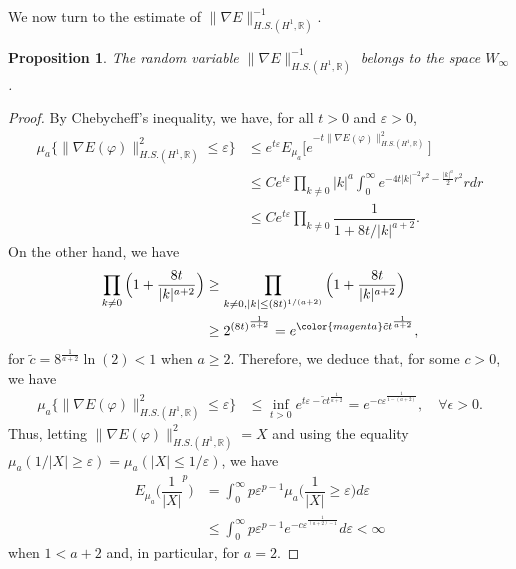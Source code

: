 \documentclass[11pt,leqno]{amsart}
\newtheorem{prop}{Proposition}[section]
\newcommand{\R}{\mathbb{R}}
\begin{document}
We now turn to the estimate of $\|\nabla E\|^{-1}_{H.S. ( H^1 , \mathbb R) }$.



\begin{prop} \label{Prop_E^-1W}
The random variable $\|\nabla E\|^{-1}_{H.S. ( H^1 ,  \mathbb R) }$ belongs to the space $W_\infty$.
\end{prop}
\begin{proof}
By Chebycheff's  inequality, we have, for all $t>0$ and $\varepsilon >0$,
\begin{align*}
\mu_a \{\|\nabla E (\varphi)\|_{H.S. ( H^1 ,  \mathbb R ) }^2 \leq \varepsilon\}& \leq e^{t\varepsilon} E_{\mu_a} \big[ e^{-t \|\nabla E(\varphi) \|_{H.S. ( H^1 , \R) }^2 }\big]\\
&\leq C e^{t\varepsilon}\prod_{k\neq 0} |k|^a \int_0^\infty e^{- 4 t |k|^{-2} r^2 - \frac{|k|^{a}}{2} r^2} rdr\\
&\leq C e^{t\varepsilon} \prod_{k\neq 0}  \dfrac{1}{1+ 8t/|k|^{a+2}}.
\end{align*}
On the other hand, we have %
\begin{align*}
\prod_{k\neq 0}   \Big(1+ \dfrac{8t}{|k|^{a+2}}\Big)& \geq \prod_{k\neq 0, |k|\leq (8t)^{1/(a+2)}}   \Big(1+ \dfrac{8t}{|k|^{a+2}}\Big) \\
&\geq 2^{(8t)^{\frac{1}{a+2}}} = e^{{\color{magenta} \tilde{c} }  t^{\frac{1}{a+2}}},
\end{align*}
 for $\tilde{c} =8^{\frac{1}{a+2}} \ln(2) <1$ when $a\geq 2$. Therefore, we deduce that, for some $c>0$, we have  %
\begin{align*}
\mu_a \{\|\nabla E (\varphi)\|_{H.S. ( H^1 , \R) }^2   \leq  \varepsilon\}& \leq  \inf_{t>0}  e^{t\varepsilon - { \tilde{c} }  t^{\frac{1}{a+2}} }
=e^{-c \varepsilon^{\frac{1}{1-(a+2)}}}, { \quad \forall \epsilon >0.}
\end{align*} 
Thus, letting $\|\nabla E (\varphi)\|_{H.S. ( H^1 ,  \mathbb R )}^2=X$ and using the equality $\mu_a (1/|X| \geq \varepsilon) = \mu_a(|X|\leq 1/\varepsilon)$, we have
 \begin{align*}
E_{\mu_a}\Big(\dfrac{1}{|X|}^p\Big) 
&= \int_0^\infty p \varepsilon^{p-1}  \mu_a \Big(\dfrac{1}{|X|} \geq \varepsilon\Big) d\varepsilon \\
&  \leq \int_0^\infty p \varepsilon^{p-1}  e^{-c \varepsilon^{\frac{1}{(a+2)-1}}  }d\varepsilon <\infty 
\end{align*}
when $1<a+2$ and, in particular, for  $a=2$.
\end{proof}
\end{document}

